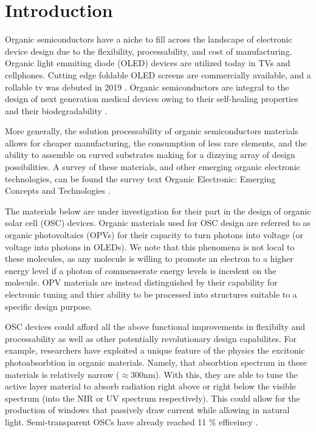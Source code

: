 \chapter{Introduction} 

Organic semiconductors have a niche to fill across the landscape of electronic
device design due to the flexibility, processability, and cost of manufacturing. 
Organic light emmiting diode (OLED) devices are utilized today in TVs and cellphones.  
Cutting edge foldable OLED screens are commercially available, and a rollable tv was debuted in 2019
\cite{Chen2020}. 
Organic semiconductors are integral to the design of next generation medical devices owing to their
self-healing properties and their biodegradability \cite{Bettinger2010}. 

More generally, the solution processability of organic semiconductors materials allows for
cheaper manufacturing, the consumption of less rare elements, 
and the ability to assemble on curved substrates making for a dizzying array of design possibilities. 
A survey of these materials, and 
other emerging organic electronic technologies, can be found the survey text 
Organic Electronic: Emerging Concepts and Technologies
\cite{FabioCicoiraEditor2013}. 

The materials below are under investigation for their part in the design of organic solar cell (OSC) devices. 
Organic materials used for OSC design are referred to as organic photovoltaics (OPVs) for their capacity
to turn photons into voltage (or voltage into photons in OLEDs). We note that this phenomena is not
local to these molecules, as any molecule is willing to promote an electron to a higher energy level if a
photon of commenserate energy levels is incedent on the molecule. OPV materials are instead distinguished by
their capability for electronic tuning and thier ability to be processed into structures suitable to a specific
design purpose.

OSC devices could afford all the above functional improvements in flexibilty and processability as well as other
potentially revolutionary design capabilites.  
For example, researchers have exploited a unique feature of the physics the excitonic photoabsorbtion in 
organic materials.  Namely, that absorbtion spectrum
in these materials is relatively narrow ($\approx$300nm).
With this, they are able to tune the active layer material to absorb radiation right above or right below the
visible spectrum (into the NIR or UV spectrum respectively). This 
could allow for the production of windows that passively draw current while allowing in natural light. Semi-transparent OSCs have already
reached 11 \% efficeincy \cite{Brabec2020}. 

